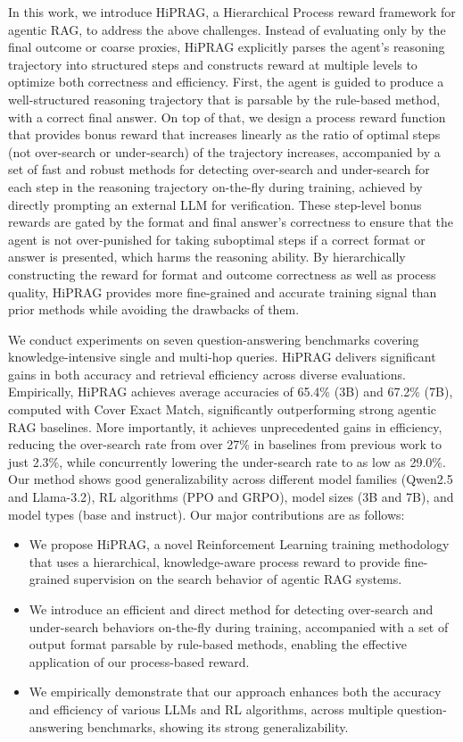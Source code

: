 \documentclass{article}
\begin{document}
In this work, we introduce HiPRAG, a Hierarchical Process reward framework for agentic RAG, to address the above challenges. Instead of evaluating only by the final outcome or coarse proxies, HiPRAG explicitly parses the agent’s reasoning trajectory into structured steps and constructs reward at multiple levels to optimize both correctness and efficiency. First, the agent is guided to produce a well-structured reasoning trajectory that is parsable by the rule-based method, with a correct final answer. On top of that, we design a process reward function that provides bonus reward that increases linearly as the ratio of optimal steps (not over-search or under-search) of the trajectory increases, accompanied by a set of fast and robust methods
for detecting over-search and under-search for each step in the reasoning trajectory on-the-fly during training, achieved by directly prompting an external LLM for verification. These step-level bonus rewards are gated by the format and final answer's correctness to ensure that the agent is not over-punished for taking suboptimal steps if a correct format or answer is presented, which harms the reasoning ability. By hierarchically constructing the reward for format and outcome correctness as well as process quality, HiPRAG provides more fine-grained and accurate training signal than prior methods while avoiding the drawbacks of them.


 We conduct experiments on seven question-answering benchmarks covering knowledge-intensive single and multi-hop queries. HiPRAG delivers significant gains in both accuracy and retrieval efficiency across diverse evaluations. Empirically, HiPRAG achieves average accuracies of 65.4\%
 (3B) and 67.2\% (7B), computed with Cover Exact Match, significantly outperforming strong agentic RAG baselines. More importantly, it achieves unprecedented gains in efficiency, reducing the over-search rate from over 27\% in baselines from previous work to just 2.3\%, while concurrently lowering the under-search rate to as low as 29.0\%. Our method shows good generalizability across different model families (Qwen2.5 and Llama-3.2), RL algorithms (PPO and GRPO), model sizes (3B and 7B), and model types (base and instruct). Our major contributions are as follows:
 \begin{itemize}
 \item We propose HiPRAG, a novel Reinforcement Learning training methodology that uses a hierarchical, knowledge-aware process reward to provide fine-grained supervision on the search behavior of agentic RAG systems.
 \item We introduce an efficient and direct method for detecting over-search and under-search behaviors on-the-fly during training, accompanied with a set of output format parsable by rule-based methods, enabling the effective application of our process-based reward.
 \item We empirically demonstrate that our approach enhances both the accuracy and efficiency of various LLMs and RL algorithms, across multiple question-answering benchmarks, showing its strong generalizability.
 \end{itemize}
\end{document}
